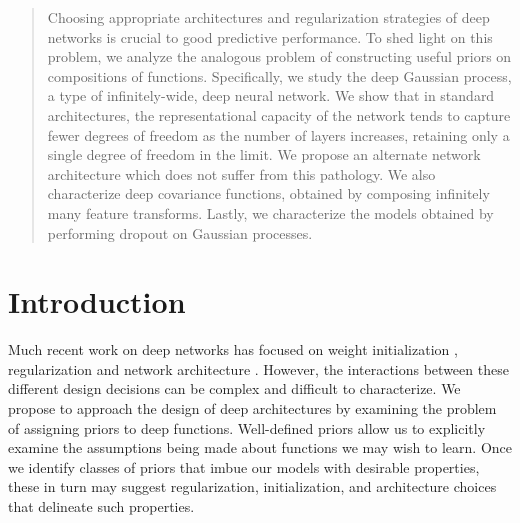 \documentclass[twoside]{article}
\newcommand{\sectiondist}{}
\begin{document}
\twocolumn[
\aistatstitle{Avoiding pathologies in very deep neural networks}
\aistatsauthor{ David Duvenaud \And Oren Rippel \And Ryan Adams \And Zoubin Ghahramani }
\aistatsaddress{ 
University of Cambridge \And %
M.I.T., Harvard University \And %
Harvard University \And %
University of Cambridge} %
]


\begin{abstract}
Choosing appropriate architectures and regularization strategies of deep networks is crucial to good predictive performance.  To shed light on this problem, we analyze the analogous problem of constructing useful priors on compositions of functions.  Specifically, we study the deep Gaussian process, a type of infinitely-wide, deep neural network.  We show that in standard architectures, the representational capacity of the network tends to capture fewer degrees of freedom as the number of layers increases, retaining only a single degree of freedom in the limit.  We propose an alternate network architecture which does not suffer from this pathology.  We also characterize deep covariance functions, obtained by composing infinitely many feature transforms.  Lastly, we characterize the models obtained by performing dropout on Gaussian processes.
\end{abstract}


\section{Introduction}
\sectiondist

Much recent work on deep networks has focused on weight initialization \citep{martens2010deep}, regularization \citep{lee2007sparse} and network architecture \citep{gens2013learning}.
However, the interactions between these different design decisions can be complex and difficult to characterize.
We propose to approach the design of deep architectures by examining the problem of assigning priors to deep functions.
Well-defined priors allow us to explicitly examine the assumptions being made about functions we may wish to learn.
Once we identify classes of priors that imbue our models with desirable properties, these in turn may suggest regularization, initialization, and architecture choices that delineate such properties.
\end{document}
